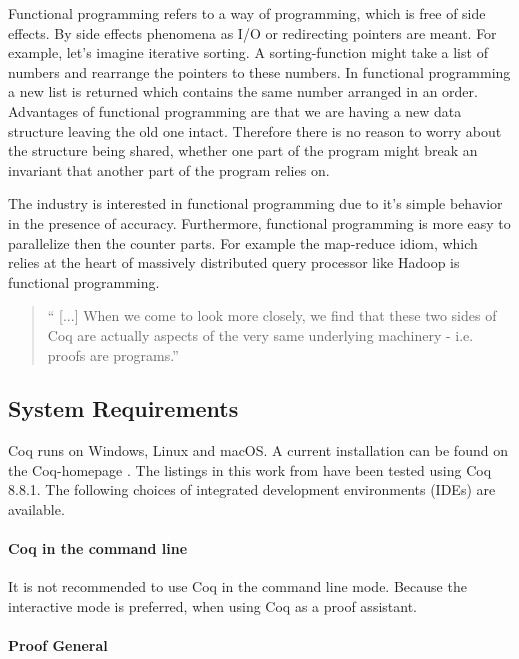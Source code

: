 Functional programming refers to a way of programming, which is free of side effects.
By side effects phenomena as I/O or redirecting pointers are meant. 
For example, let's imagine iterative sorting. 
A sorting-function might take a list of numbers and rearrange the pointers to these numbers.
In functional programming a new list is returned which contains the same number arranged in an order.\\ 
Advantages of functional programming are that we are having a new data structure leaving the old one intact. 
Therefore there is no reason to worry about the structure being shared, whether one part of the program might break an invariant that another part of the program relies on.\par
The industry is interested in functional programming due to it's simple behavior in the presence of accuracy.
Furthermore, functional programming is more easy to parallelize then the counter parts.
For example the map-reduce idiom, which relies at the heart of massively distributed query processor like \gls{Hadoop} is functional programming. 

\begin{quote}
`` [...] When we come to look more closely, we find that these two sides of Coq are actually aspects of the very same underlying machinery - i.e. proofs are programs.'' \cite{PACGGHSY}
\end{quote}




\subsection{System Requirements}
\label{subsection:systemrequirements}

Coq runs on Windows, Linux and macOS.
A current installation can be found on the Coq-homepage \cite{Coq}. 
The listings in this work from \cite{PACGGHSY} have been tested using Coq 8.8.1.
The following choices of integrated development environments (IDEs) are available. 


\paragraph{Coq in the command line}
\label{par:CoqInTheCommandLine}

It is not recommended to use Coq in the command line mode. 
Because the interactive mode is preferred, when using Coq as a proof assistant. 


\paragraph{Proof General}
\label{par:proofGeneral}

